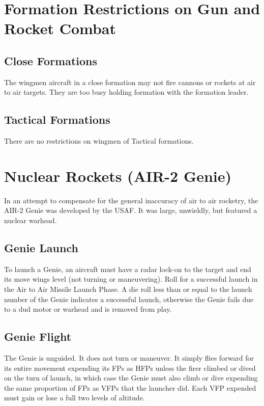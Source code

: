 \begin{advancedrules}
    \section{Formation Restrictions on Gun and Rocket Combat}

    \subsection{Close Formations} The wingmen aircraft in a close formation may not fire cannons or rockets at air to air targets. They are too busy holding formation with the formation leader.

    \subsection{Tactical Formations} There are no restrictions on wingmen of Tactical formations.

    \section{Nuclear Rockets (AIR-2 Genie)}
    \label{rule:air-to-air-nuclear-rockets}
    \label{rule:genie}


    In an attempt to compensate for the general inaccuracy of air to air rocketry, the AIR-2 Genie was developed by the USAF. It was large, unwieldly, but featured a nuclear warhead.

    \subsection{Genie Launch} To launch a Genie, an aircraft must have a radar lock-on to the target and end its move wings level (not turning or maneuvering). Roll for a successful launch in the Air to Air Missile Launch Phase. A die roll less than or equal to the launch number of the Genie indicates a successful launch, otherwise the Genie fails due to a dud motor or warhead and is removed from play.

    \subsection{Genie Flight} The Genie is unguided. It does not turn or maneuver. It simply flies forward for its entire movement expending its FPs as HFPs unless the firer climbed or dived on the turn of launch, in which case the Genie must also climb or dive expending the same proportion of FPs as VFPs that the launcher did. Each VFP expended must gain or lose a full two levels of altitude.


\end{advancedrules}

